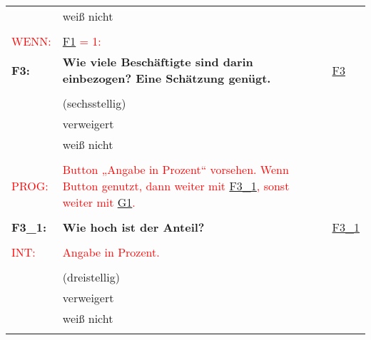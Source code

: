 \begin{longtable}{!{\color{black}\vline width 1pt}  L{2cm}!{\color{black}\vline width 1pt} L{12.25cm}!{\color{black}\vline width 1pt}  L{2.5cm}!{\color{black}\vline width 1pt}}
   & weiß nicht &  \\ 
   &  &  \\ 
   \midrule
{}\textcolor{red}{WENN:} & \textcolor{red}{ \hyperref[F1]{F1} = 1:} &  \\ 
  \textbf{F3:}\label{F3} & \textbf{Wie viele Beschäftigte sind darin einbezogen? Eine Schätzung genügt. } & \hyperref[var:F3]{F3} \\ 
   &  &  \\ 
   & (sechsstellig) &  \\ 
   & verweigert &  \\ 
   & weiß nicht &  \\ 
   &  &  \\ 
  \textcolor{red}{PROG:} & \textcolor{red}{Button „Angabe in Prozent“ vorsehen. Wenn Button genutzt, dann weiter mit  \hyperref[F3:1]{F3\_1}, sonst weiter mit  \hyperref[G1]{G1}.} &  \\ 
   &  &  \\ 
   \midrule
{}\textbf{F3\_1:}\label{F3:1} & \textbf{Wie hoch ist der Anteil?} & \hyperref[var:F3:1]{F3\_1} \\ 
   &  &  \\ 
  \textcolor{red}{INT:} & \textcolor{red}{Angabe in Prozent.} &  \\ 
   &  &  \\ 
   & (dreistellig) &  \\ 
   & verweigert &  \\ 
   & weiß nicht &  \\ 
   &  &  \\ 

\end{longtable}
